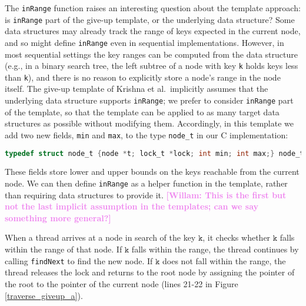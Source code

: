 \documentclass[a4paper,UKenglish,cleveref, autoref, thm-restate]{lipics-v2021}
\newcommand{\wm}[1]{\textbf{\textcolor{violet}{[Willam: #1]}}}
\begin{document}
The \lstinline{inRange} function raises an interesting question about the template approach: is \lstinline{inRange} part of the give-up template, or the underlying data structure? Some data structures may already track the range of keys expected in the current node, and so might define \lstinline{inRange} even in sequential implementations. However, in most sequential settings the key ranges can be computed from the data structure (e.g., in a binary search tree, the left subtree of a node with key \lstinline{k} holds keys less than \lstinline{k}), and there is no reason to explicitly store a node's range in the node itself. The give-up template of Krishna et al.~implicitly assumes that the underlying data structure supports \lstinline{inRange}; we prefer to consider \lstinline{inRange} part of the template, so that the template can be applied to as many target data structures as possible without modifying them. Accordingly, in this template we add two new fields, \lstinline{min} and \lstinline{max}, to the type \lstinline{node_t} in our C implementation:
\begin{lstlisting}[language = C, backgroundcolor=\color{white}, basicstyle=\ttfamily\footnotesize]
	typedef struct node_t {node *t; lock_t *lock; int min; int max;} node_t;
\end{lstlisting}
These fields store lower and upper bounds on the keys reachable from the current node. %
We can then define \lstinline{inRange} as a helper function in the template, rather than requiring data structures to provide it. \wm{This is the first but not the last implicit assumption in the templates; can we say something more general?}



When a thread arrives at a node in search of the key $\texttt{k}$, it checks whether $\texttt{k}$ falls within the range of that node. If $\texttt{k}$ falls within the range, the thread continues by calling \lstinline{findNext} to find the new node. If $\texttt{k}$ does not fall within the range, the thread releases the lock and returns to the root node by assigning the pointer of the root to the pointer of the current node (lines 21-22 in Figure \ref{traverse_giveup_a}).
\end{document}
